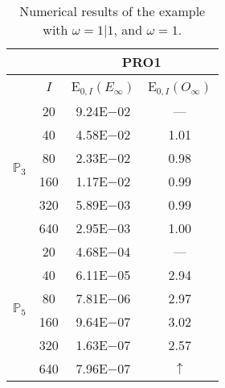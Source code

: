 \begin{table}[H]
\caption{Numerical results of the example with $\omega=1|1$, and $\omega=1$.}
\setlength{\tabcolsep}{5pt}
\centering
\begin{tabular}{@{}l c c c@{}}
\toprule
 &  & \multicolumn{2}{c}{PRO1}\\
\midrule
 & $I$ & E$_{0,I}(E_{\infty})$ & E$_{0,I}(O_{\infty})$\\
\midrule
\multirow{6}{*}{$\mathbb{P}_{3}$}
 & 20 & 9.24E$-$02 & ---\\
 & 40 & 4.58E$-$02 & 1.01\\
 & 80 & 2.33E$-$02 & 0.98\\
 & 160 & 1.17E$-$02 & 0.99\\
 & 320 & 5.89E$-$03 & 0.99\\
 & 640 & 2.95E$-$03 & 1.00\\
\midrule
\multirow{6}{*}{$\mathbb{P}_{5}$}
 & 20 & 4.68E$-$04 & ---\\
 & 40 & 6.11E$-$05 & 2.94\\
 & 80 & 7.81E$-$06 & 2.97\\
 & 160 & 9.64E$-$07 & 3.02\\
 & 320 & 1.63E$-$07 & 2.57\\
 & 640 & 7.96E$-$07 & $\uparrow$\\
\bottomrule
\end{tabular}
\label{Table:PRO:test_01_01_test42_pro1}
\end{table}
